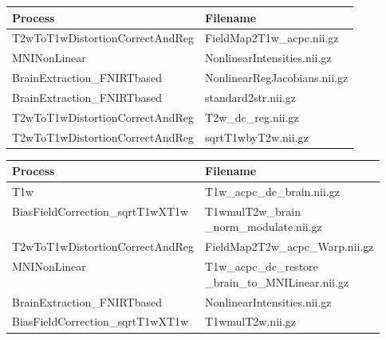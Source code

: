 \hfill \break

\hfill \break
\begin{center}
\begin{tabular}{|l|l|}
\hline
\textbf{Process}      & \textbf{Filename} \\ \hline
T2wToT1wDistortionCorrectAndReg               & FieldMap2T1w\_acpc.nii.gz    \\ \hline
MNINonLinear             & NonlinearIntensities.nii.gz    \\ \hline
BrainExtraction\_FNIRTbased & NonlinearRegJacobians.nii.gz   \\ \hline
BrainExtraction\_FNIRTbased & standard2str.nii.gz \\ \hline
T2wToT1wDistortionCorrectAndReg & T2w\_dc\_reg.nii.gz \\ \hline
T2wToT1wDistortionCorrectAndReg & sqrtT1wbyT2w.nii.gz \\ \hline
\end{tabular}
\label{tab:PreFreeSurfer_NRMSE_processes}
\end{center}
\hfill \break

\hfill \break
\begin{center}
\begin{tabular}{|l|l|}
\hline
\textbf{Process}      & \textbf{Filename} \\ \hline
T1w              & T1w\_acpc\_dc\_brain.nii.gz    \\ \hline
BiasFieldCorrection\_sqrtT1wXT1w             & \makecell[l]{T1wmulT2w\_brain\\\_norm\_modulate.nii.gz}    \\ \hline
T2wToT1wDistortionCorrectAndReg & FieldMap2T2w\_acpc\_Warp.nii.gz   \\ \hline
MNINonLinear & \makecell[l]{T1w\_acpc\_dc\_restore\\\_brain\_to\_MNILinear.nii.gz} \\ \hline
BrainExtraction\_FNIRTbased & NonlinearIntensities.nii.gz \\ \hline
BiasFieldCorrection\_sqrtT1wXT1w & T1wmulT2w.nii.gz \\ \hline
\end{tabular}
\label{tab:PreFreeSurfer_NRMSE_processes}
\end{center}
\hfill \break


